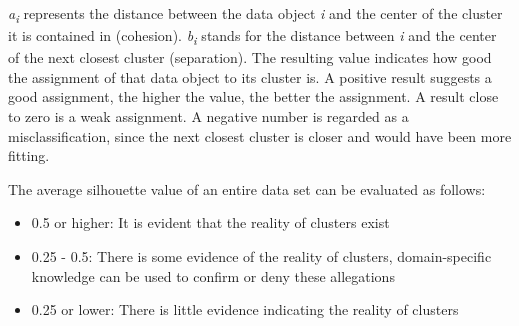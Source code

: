   \textit{a\textsubscript{i}} represents the distance between the data object \textit{i} and the center of the cluster it is contained in (cohesion). \textit{b\textsubscript{i}} stands for the distance between \textit{i} and the center of the next closest cluster (separation). The resulting value indicates how good the assignment of that data object to its cluster is. A positive result suggests a good assignment, the higher the value, the better the assignment. A result close to zero is a weak assignment. A negative number is regarded as a misclassification, since the next closest cluster is closer and would have been more fitting. 

  The average silhouette value of an entire data set can be evaluated as follows:
  \begin{itemize}
    \item 0.5 or higher: It is evident that the reality of clusters exist
    \item 0.25 - 0.5: There is some evidence of the reality of clusters, domain-specific knowledge can be used to confirm or deny these allegations
    \item 0.25 or lower: There is little evidence indicating the reality of clusters
  \end{itemize}


